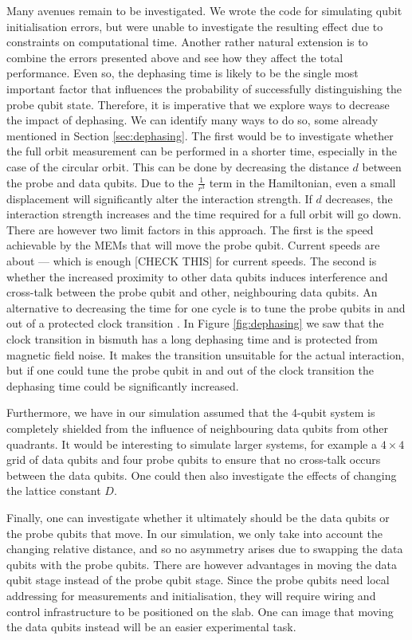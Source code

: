 Many avenues remain to be investigated. We wrote the code for simulating qubit initialisation errors, but were unable to investigate the resulting effect due to constraints on computational time. Another rather natural extension is to combine the errors presented above and see how they affect the total performance. Even so, the dephasing time is likely to be the single most important factor that influences the probability of successfully distinguishing the probe qubit state. Therefore, it is imperative that we explore ways to decrease the impact of dephasing. We can identify many ways to do so, some already mentioned in Section \ref{sec:dephasing}. The first would be to investigate whether the full orbit measurement can be performed in a shorter time, especially in the case of the circular orbit. This can be done by decreasing the distance $d$ between the probe and data qubits. Due to the $\frac{1}{r^3}$ term in the Hamiltonian, even a small displacement will significantly alter the interaction strength. If $d$ decreases, the interaction strength increases and the time required for a full orbit will go down. There are however two limit factors in this approach. The first is the speed achievable by the MEMs that will move the probe qubit. Current speeds are about --- \cite{something} which is enough [CHECK THIS] for current speeds. The second is whether the increased proximity to other data qubits induces interference and cross-talk between the probe qubit and other, neighbouring data qubits. 
 An alternative to decreasing the time for one cycle is to tune the probe qubits in and out of a protected clock transition \cite{something}. In Figure \ref{fig:dephasing} we saw that the clock transition in bismuth has a long dephasing time and is protected from magnetic field noise. It makes the transition unsuitable for the actual interaction, but if one could tune the probe qubit in and out of the clock transition the dephasing time could be significantly increased. 

Furthermore, we have in our simulation assumed that the 4-qubit system is completely shielded from the influence of neighbouring data qubits from other quadrants. It would be interesting to simulate larger systems, for example a $4\times 4$ grid of data qubits and four probe qubits to ensure that no cross-talk occurs between the data qubits. One could then also investigate the effects of changing the lattice constant $D$. 

Finally, one can investigate whether it ultimately should be the data qubits or the probe qubits that  move. In our simulation, we only take into account the changing relative distance, and so no asymmetry arises due to swapping the data qubits with the probe qubits. There are however advantages in moving the data qubit stage instead of the probe qubit stage. Since the probe qubits need local addressing for measurements and initialisation, they will require wiring and control infrastructure to be positioned on the slab. One can image that moving the data qubits instead will be an easier experimental task. 

